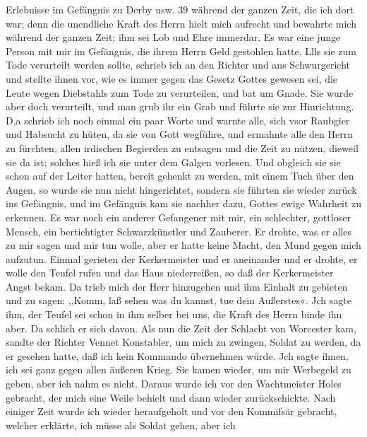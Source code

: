 Erlebnisse im Gefängnis zu Derby usw. 39
während der ganzen Zeit, die ich dort war; denn die unendliche
Kraft des Herrn hielt mich aufrecht und bewahrte mich während
der ganzen Zeit; ihm sei Lob und Ehre immerdar.
Es war eine junge Person mit mir im Gefängnis, die ihrem
Herrn Geld gestohlen hatte. Llls sie zum Tode verurteilt werden
sollte, schrieb ich an den Richter und ans Schwurgericht und
stellte ihnen vor, wie es immer gegen das Gesetz Gottes gewesen
sei, die Leute wegen Diebstahls zum Tode zu verurteilen, und
bat um Gnade. Sie wurde aber doch verurteilt, und man grub
ihr ein Grab und führte sie zur Hinrichtung. D,a schrieb ich noch
einmal ein paar Worte und warnte alle, sich vsor Raubgier und
Habsucht zu hüten, da sie von Gott wegführe, und ermahnte alle
den Herrn zu fürchten, allen irdischen Begierden zu entsagen und
die Zeit zu nützen, dieweil sie da ist; solches hieß ich sie unter
dem Galgen vorlesen. Und obgleich sie sie schon auf der Leiter
hatten, bereit gehenkt zu werden, mit einem Tuch über den Augen,
so wurde sie nun nicht hingerichtet, sondern sie führten sie wieder
zurück ins Gefängnis, und im Gefängnis kam sie nachher dazu,
Gottes ewige Wahrheit zu erkennen.
Es war noch ein anderer Gefangener mit mir, ein schlechter,
gottloser Mensch, ein bertichtigter Schwarzkünstler und Zauberer.
Er drohte, was er alles zu mir sagen und mir tun wolle, aber
er hatte keine Macht, den Mund gegen mich aufzutun. Einmal
gerieten der Kerkermeister und er aneinander und er drohte, er
wolle den Teufel rufen und das Haus niederreißen, so daß der
Kerkermeister Angst bekam. Da trieb mich der Herr hinzugehen
und ihm Einhalt zu gebieten und zu sagen: ,,Komm, laß sehen
was du kannst, tue dein Außerstes«. Jch sagte ihm, der Teufel
sei schon in ihm selber bei uns, die Kraft des Herrn binde ihn
aber. Da schlich er sich davon.
Als nun die Zeit der Schlacht von Worcester kam, sandte
der Richter Vennet Konstabler, um mich zu zwingen, Soldat zu
werden, da er gesehen hatte, daß ich kein Kommando übernehmen
würde. Jch sagte ihnen, ich sei ganz gegen allen äußeren Krieg.
Sie kamen wieder, um mir Werbegeld zu geben, aber ich nahm
es nicht. Daraus wurde ich vor den Wachtmeister Holes gebracht,
der mich eine Weile behielt und dann wieder zurückschickte. Nach
einiger Zeit wurde ich wieder heraufgeholt und vor den Kommifsär
gebracht, welcher erklärte, ich müsse als Soldat gehen, aber ich


